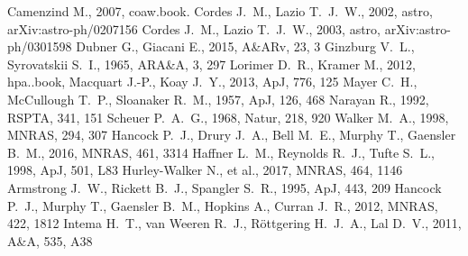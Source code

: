 \documentclass[a4paper]{article}
\begin{document}

\begin{thebibliography}{99}
 Camenzind M., 2007, coaw.book.
 Cordes J.~M., Lazio T.~J.~W., 2002, astro, arXiv:astro-ph/0207156 
 Cordes J.~M., Lazio T.~J.~W., 2003, astro, arXiv:astro-ph/0301598 
 Dubner G., Giacani E., 2015, A\&ARv, 23, 3 
 Ginzburg V.~L., Syrovatskii S.~I., 1965, ARA\&A, 3, 297 
 Lorimer D.~R., Kramer M., 2012, hpa..book,
 Macquart J.-P., Koay J.~Y., 2013, ApJ, 776, 125 
 Mayer C.~H., McCullough T.~P., Sloanaker R.~M., 1957, ApJ, 126, 468 
 Narayan R., 1992, RSPTA, 341, 151 
 Scheuer P.~A.~G., 1968, Natur, 218, 920 
 Walker M.~A., 1998, MNRAS, 294, 307 
 Hancock P.~J., Drury J.~A., Bell M.~E., Murphy T., Gaensler B.~M., 2016, MNRAS, 461, 3314 
 Haffner L.~M., Reynolds R.~J., Tufte S.~L., 1998, ApJ, 501, L83 
 Hurley-Walker N., et al., 2017, MNRAS, 464, 1146 
 Armstrong J.~W., Rickett B.~J., Spangler S.~R., 1995, ApJ, 443, 209 
 Hancock P.~J., Murphy T., Gaensler B.~M., Hopkins A., Curran J.~R., 2012, MNRAS, 422, 1812 
 Intema H.~T., van Weeren R.~J., R{\"o}ttgering H.~J.~A., Lal D.~V., 2011, A\&A, 535, A38 
\end{thebibliography}


\bsp	%
\label{lastpage}
\end{document}
